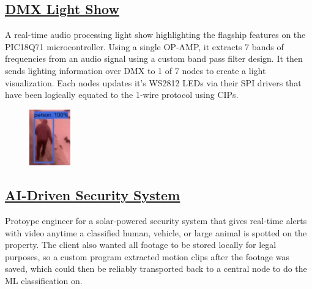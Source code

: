 \documentclass[
	10pt, %
]{FreemanCV}
\begin{document}
\begin{paracol}{2}
\vspace*{-10pt} %
\leavevmode\subsection{\href{https://github.com/jfcbooth/3dpp}{DMX Light Show \scriptsize\faLink}}

A real-time audio processing light show highlighting the flagship features on the PIC18Q71 microcontroller.
Using a single OP-AMP, it extracts 7 bands of frequencies from an audio signal using a custom band pass filter design.
It then sends lighting information over DMX to 1 of 7 nodes to create a light visualization.
Each nodes updates it's WS2812 LEDs via their SPI drivers that have been logically equated to the 1-wire protocol using CIPs.



\setlength\intextsep{20pt} %
\begin{figure} %
    \includegraphics[width=50pt]{security_system} %
\end{figure}

\leavevmode \subsection{\href{https://github.com/jfcbooth/security_system}{AI-Driven Security System \scriptsize\faLink}}

Protoype engineer for a solar-powered security system that gives real-time alerts with video anytime a classified human, vehicle, or large animal is spotted
on the property. The client also wanted all footage to be stored locally for legal purposes, so a custom program extracted motion clips
after the footage was saved, which could then be reliably transported back to a central node to do the ML classification on.


\end{paracol}
\end{document}

